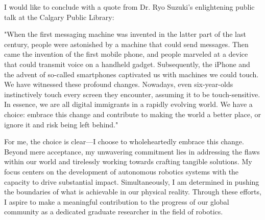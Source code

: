 \documentclass{article}
\begin{document}
I would like to conclude with a quote from Dr. Ryo Suzuki's enlightening public talk at the Calgary Public Library:

"When the first messaging machine was invented in the latter part of the last century, people were astonished 
by a machine that could send messages. Then came the invention of the first mobile phone, 
and people marveled at a device that could transmit voice on a handheld gadget. Subsequently, 
the iPhone and the advent of so-called smartphones captivated us with machines we could touch. 
We have witnessed these profound changes. Nowadays, even six-year-olds instinctively touch every screen they encounter, 
assuming it to be touch-sensitive. In essence, we are all digital immigrants in a rapidly evolving world. We have a choice: 
embrace this change and contribute to making the world a better place, or ignore it and risk being left behind."

For me, the choice is clear—I choose to wholeheartedly embrace this change.
Beyond mere acceptance, my unwavering commitment lies in addressing the flaws within our world 
and tirelessly working towards crafting tangible solutions.
My focus centers on the development of autonomous robotics systems with the capacity to 
drive substantial impact. Simultaneously, I am determined in pushing the boundaries of what is 
achievable in our physical reality. Through these efforts, I aspire to make a meaningful contribution 
to the progress of our global community as a dedicated graduate researcher in the field of robotics.


\printbibliography
\end{document}
